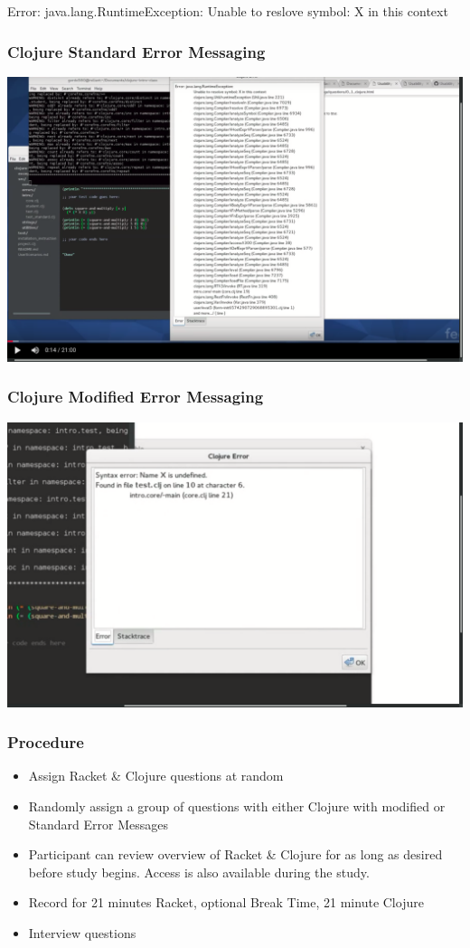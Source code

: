 \documentclass{beamer}
\begin{document}
\begin{frame}
Error: java.lang.RuntimeException: Unable to reslove symbol: X in this context
  \frametitle{Clojure Standard Error Messaging}
  \includegraphics[scale=.17]{CS20Sshot}
\end{frame}

\begin{frame}
  \frametitle{Clojure Modified Error Messaging}
  \includegraphics[scale=.17]{CM16shot}
\end{frame}

\begin{frame}
  \frametitle{Procedure}
\begin{itemize}

\item Assign Racket \& Clojure questions at random
\item Randomly assign a group of questions with either Clojure with modified or Standard Error Messages
\item Participant can review overview of Racket \& Clojure for as long as desired before study begins. Access is also available during the study.
\item Record for 21 minutes Racket, optional Break Time, 21 minute Clojure
\item Interview questions
  
\end{itemize}  
\end{frame}
\end{document}
